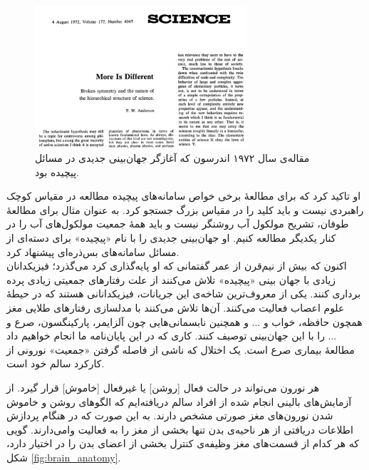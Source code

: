 \begin{figure}
	\centering
	\includegraphics[width=0.7\textwidth]{../Figures/more_is_different_anderson.png}
	\caption{
		مقاله‌ی سال ۱۹۷۲ اندرسون که آغازگر جهان‌بینی جدیدی در مسائل پیچیده بود.}
	\label{fig:anderson}
\end{figure}


او تاکید کرد که برای مطالعهٔ برخی خواص سامانه‌های پیچیده مطالعه در مقیاس کوچک راهبردی نیست و باید کلید را در مقیاس بزرگ جستجو کرد. به عنوان مثال برای مطالعهٔ طوفان، تشریح مولکول آب روشنگر نیست و باید همهٔ جمعیت مولکول‌های آب را در کنار یکدیگر مطالعه کنیم. او  جهان‌بینی جدیدی را با نام «پیچیده»
 برای دسته‌ای از مسائل سامانه‌های بس‌ذره‌ای پیشنهاد کرد.\\
 
 اکنون که بیش از نیم‌قرن از عمر گفتمانی که او پایه‌گذاری کرد می‌گذرد؛ فیزیکدانان زیادی با جهان بینی «پیچیده» تلاش می‌کنند از علت رفتارهای جمعیتی زیادی پرده برداری کنند. یکی از معروف‌ترین شاخه‌ی این جریانات، فیزیکدانانی هستند که در حیطهٔ علوم اعصاب فعالیت می‌کنند. آن‌ها تلاش می‌کنند با مدلسازی رفتارهای طلایی مغز همچون حافظه، خواب و ... و همچنین نابسمانی‌هایی چون آلزایمر، پارکینگسون، صرع و ... را با این جهان‌بینی توصیف کنند. کاری که در این پایان‌نامه ما انجام خواهیم داد مطالعهٔ بیماری صرع است. یک اختلال که ناشی از فاصله گرفتن «جمعیت» نورونی از کارکرد سالم خود است.

 هر نورون‌ می‌تواند در حالت فعال [روشن] یا غیرفعال [خاموش] قرار گیرد. از آزمایش‌های بالینی انجام شده از افراد سالم دریافته‌ایم که الگوهای روشن و خاموش شدن نورون‌های مغز صورتی مشخص دارند. به این صورت که در هنگام پردازش اطلاعات دریافتی از هر ناحیه‌ی بدن تنها بخشی از مغز را به فعالیت وامی‌دارند. گویی که هر کدام از قسمت‌های مغز وظیفه‌ی کنترل بخشی از اعضای بدن را در اختیار دارد، شکل \ref{fig:brain_anatomy}. 

